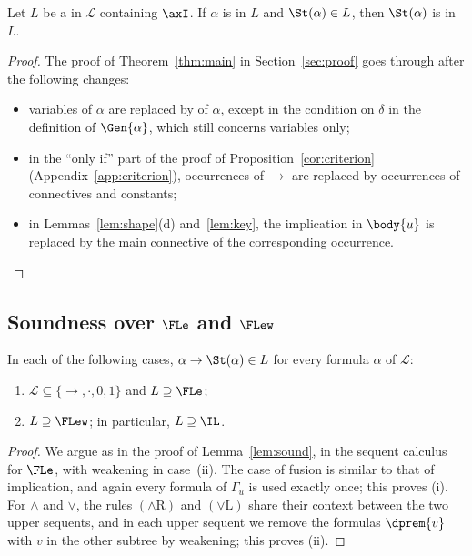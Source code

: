 \begin{theorem}\label{thm:main-fl}
Let $L$ be a  in $\mathcal L$ containing $\axI$. If $\alpha$ is 
in $L$ and $\St(\alpha)\in L$, then $\St(\alpha)$ is  in $L$.
\end{theorem}
\begin{proof}
The proof of Theorem~\ref{thm:main} in Section~\ref{sec:proof} goes through after the following changes:
\begin{itemize}
\item variables of $\alpha$ are replaced by  of $\alpha$, except
  in the condition on $\delta$ in the definition of $\Gen{\alpha}$, which still
  concerns variables only;
\item in the ``only if'' part of the proof of
  Proposition~\ref{cor:criterion} (Appendix~\ref{app:criterion}), occurrences of $\to$ are replaced by
  occurrences of connectives and constants;
\item in Lemmas~\ref{lem:shape}(d) and~\ref{lem:key},
  the implication in $\body{u}$ is replaced by the main connective of the
  corresponding occurrence.\qedhere
\end{itemize}
\end{proof}

\subsection{Soundness over \texorpdfstring{$\FLe$}{FLe} and \texorpdfstring{$\FLew$}{FLew}}

\begin{lemma}\label{lem:sound-fl}
In each of the following cases, $\alpha\to\St(\alpha)\in L$ for every
formula $\alpha$ of $\mathcal L$:
\begin{enumerate}
\item[(i)] $\mathcal L\subseteq\{\to,\cdot,0,1\}$ and $L\supseteq\FLe$;
\item[(ii)] $L\supseteq\FLew$; in particular, $L\supseteq\IL$.
\end{enumerate}
\end{lemma}
\begin{proof}
We argue as in the proof of Lemma~\ref{lem:sound}, in the sequent calculus
for $\FLe$, with weakening in case~(ii). The case of fusion is
similar to that of implication, and again every formula of $\Gamma_u$ is
used exactly once; this proves (i). For $\wedge$ and $\vee$, the rules
$({\wedge}\mathrm{R})$ and $({\vee}\mathrm{L})$ share their context between
the two upper sequents, and in each upper sequent we remove the formulas $\dprem{v}$
with $v$ in the other subtree by weakening; this proves (ii).
\end{proof}

